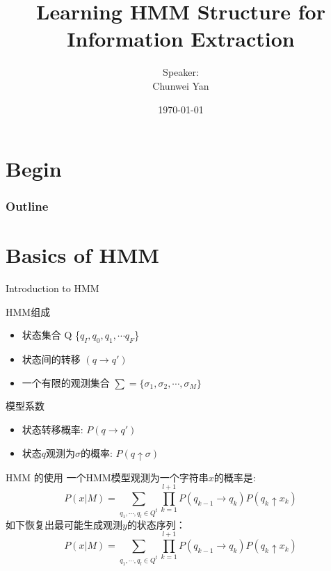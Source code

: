 \documentclass{beamer}
\title{Learning HMM Structure for Information Extraction}
\author{Speaker:\\Chunwei Yan}
\institute[PKUSZ]{
    互联网研发中心\\
}
\date{\today}
\begin{document}
\begin{frame}
  \titlepage
\end{frame}

\section{Begin}
\begin{frame}
\frametitle{Outline}
\tableofcontents
\end{frame}

\section{Basics of HMM}
\begin{frame}{Introduction to HMM}
\begin{block}{HMM组成 }
    \begin{itemize}
        \item 状态集合 Q \{$q_I, q_0, q_1, \cdots q_F$\}
        \item 状态间的转移 $(q \rightarrow q')$
        \item 一个有限的观测集合 $\sum = \{ \sigma_1, \sigma_2, \cdots, \sigma_M\}$
    \end{itemize}
\end{block}

\begin{block}{模型系数}
\begin{itemize}
    \item 状态转移概率: $P(q \rightarrow q')$
    \item 状态$q$观测为$\sigma$的概率: $P(q \uparrow \sigma)$ 
\end{itemize}
\end{block}
\end{frame}

\begin{frame}{HMM 的使用}
    一个HMM模型观测为一个字符串$x$的概率是:
    \begin{equation}
    P(x|M) = \sum_{q_1,\cdots,q_l \in Q^t} {
        \prod_{k=1}^{l+1}{
            P(q_{k-1} \rightarrow q_k) P(q_k \uparrow x_k)
        }
    }
    \end{equation}
    如下恢复出最可能生成观测$y$的状态序列：
    \begin{equation}
    P(x|M) = \sum_{q_1,\cdots,q_l \in Q^t} {
        \prod_{k=1}^{l+1}{
            P(q_{k-1} \rightarrow q_k) P(q_k \uparrow x_k)
        }
    }
    \end{equation}
\end{frame}
\end{document}
